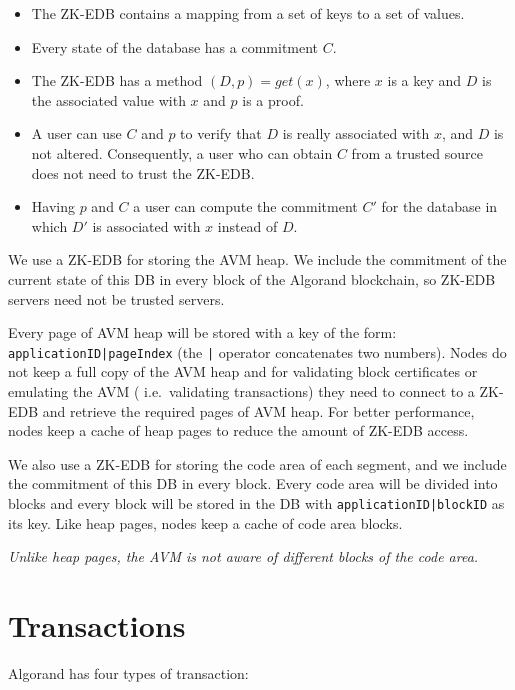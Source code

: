 \documentclass[11pt, A4]{report}
\begin{document}
    \begin{itemize}
        \item The ZK-EDB contains a mapping from a set of keys to a set of values.
        \item Every state of the database has a commitment \(C\).
        \item The ZK-EDB has a method \((D, p) = get(x)\), where \(x\) is a key and \(D\) is the associated value
        with \(x\) and \(p\) is a proof.
        \item A user can use \(C\) and \(p\) to verify that \(D\) is really associated with \(x\), and \(D\) is not
        altered. Consequently, a user who can obtain \(C\) from a trusted source does not need to trust the ZK-EDB.
        \item Having \(p\) and \(C\) a user can compute the commitment \(C'\) for the database in which \(D'\) is
        associated with \(x\) instead of \(D\).
    \end{itemize}

    We use a ZK-EDB for storing the AVM heap. We include the commitment of the current state of this DB in every
    block of the Algorand blockchain, so ZK-EDB servers need not be trusted servers.

    Every page of AVM heap will be stored with a key of the form: \texttt{applicationID|pageIndex} (the \texttt{|}
    operator concatenates two numbers). Nodes do not keep a full copy of the AVM heap and for validating block
    certificates or emulating the AVM ( i.e.~validating transactions) they need to connect to a ZK-EDB and retrieve
    the required pages of AVM heap. For better performance, nodes keep a cache of heap pages to
    reduce the amount of ZK-EDB access.

    We also use a ZK-EDB for storing the code area of each segment, and we include the commitment of this DB in every
    block. Every code area will be divided into blocks and every block will be stored in the DB with
    \texttt{applicationID|blockID} as its key. Like heap pages, nodes keep a cache of code area blocks.

    \emph{Unlike heap pages, the AVM is not aware of different blocks of the code area.}


    \section{Transactions}\label{sec:transactions}

    Algorand has four types of transaction:
\end{document}
